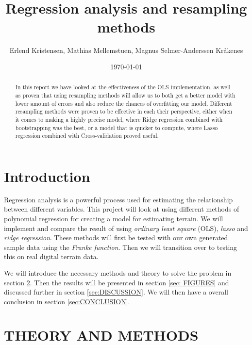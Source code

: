 \documentclass[english,notitlepage,reprint,nofootinbib]{revtex4-1}  %
\begin{document}
\title{Regression analysis and resampling methods}  %
\author{Erlend Kristensen, Mathias Mellemstuen, Magnus Selmer-Anderssen Kråkenes} %
\date{\today}      


\noaffiliation                            %

\begin{abstract}
    In this report we have looked at the effectiveness of the OLS implementation, as well as proven that using resampling methods will allow us to both get a better model with lower amount of errors and also reduce the chances of overfitting our model. Different resampling methods were proven to be effective in each their perspective, either when it comes to making a highly precise model, where Ridge regression combined with bootstrapping was the best, or a model that is quicker to compute, where Lasso regression combined with Cross-validation proved useful.
\end{abstract}
\maketitle



\section{Introduction}
\label{sec:INTRODUCTION}
Regression analysis is a powerful process used for estimating the relationship between different variables. This project will look at using different methods of polynomial regression for creating a model for estimating terrain. We will implement and compare the result of using \textit{ordinary least square} (OLS), \textit{lasso} and \textit{ridge regression}. These methods will first be tested with our own generated sample data using the \textit{Franke function}. Then we will transition over to testing this on real digital terrain data.

We will introduce the necessary methods and theory to solve the problem in section \ref{sec:METHODS}. Then the results will be presented in section \ref{sec: FIGURES} and discussed further in section \ref{sec:DISCUSSION}. We will then have a overall conclusion in section \ref{sec:CONCLUSION}.
\section{THEORY AND METHODS}
\label{sec:METHODS}
\end{document}
